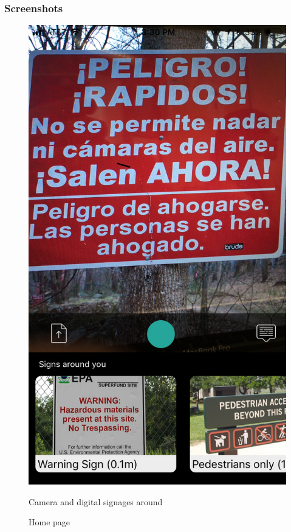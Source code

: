 \documentclass[12pt]{article}
\begin{document}
 
 \subsubsection{Screenshots}
 

 \begin{figure} [H]
\centering
\begin{minipage}{.5\textwidth}
  \centering
  \includegraphics[width=0.9\linewidth]{media/1.jpg}
  \caption{Home page}{Camera and digital signages around}
  \label{fig:landing}
\end{minipage}%
\begin{minipage}{.5\textwidth}
  \centering

\end{minipage}
\end{figure}
\end{document}
